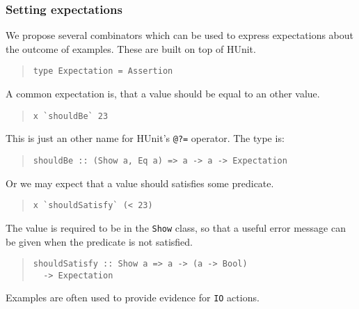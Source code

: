 \documentclass[preprint]{sigplanconf}
\begin{document}
\subsubsection{Setting expectations}

We propose several combinators which can be used to express expectations
about the outcome of examples.  These are built on top of HUnit.

\begin{quote}\small\begin{verbatim}
type Expectation = Assertion
\end{verbatim}\end{quote}

\noindent A common expectation is, that a value should be equal to an other
value.

\begin{quote}\small\begin{verbatim}
x `shouldBe` 23
\end{verbatim}\end{quote}

\noindent This is just an other name for HUnit's \texttt{@?=}
operator.  The type is:

\begin{quote}\small\begin{verbatim}
shouldBe :: (Show a, Eq a) => a -> a -> Expectation
\end{verbatim}\end{quote}

\noindent Or we may expect that a value should satisfies some
predicate.

\begin{quote}\small\begin{verbatim}
x `shouldSatisfy` (< 23)
\end{verbatim}\end{quote}

\noindent The value is required to be in the \texttt{Show} class, so that a
useful error message can be given when the predicate is not satisfied.

\begin{quote}\small\begin{verbatim}
shouldSatisfy :: Show a => a -> (a -> Bool)
  -> Expectation
\end{verbatim}\end{quote}

\noindent Examples are often used to provide evidence for {\tt IO}
actions.
\end{document}
